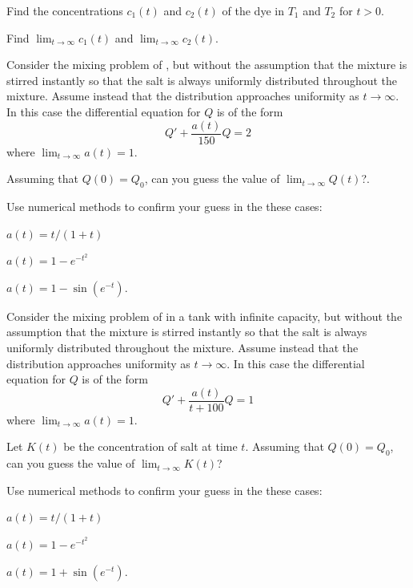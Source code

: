 \begin{exerciselist}
\begin{alist}
\item %
Find the concentrations $c_1(t)$ and $c_2(t)$ of the dye in $T_1$
and $T_2$ for $t>0$.
\item %
Find $\lim_{t\to\infty}c_1(t)$  and $\lim_{t\to\infty}c_2(t)$.
\end{alist}

\item\label{exer:4.2.22}\Lex
Consider the mixing problem of , but without
the assumption that the mixture is stirred instantly so that the salt
is always uniformly distributed throughout the mixture. Assume instead
that the distribution approaches uniformity as $t\to\infty$.
In this case the differential equation for $Q$ is  of the form
\[
Q'+\frac{a(t)}{150}Q=2
\]
where  $\lim_{t\to\infty}a(t)=1$.
\begin{alist}
\item %
Assuming that
$Q(0)=Q_0$, can you guess the value of
$\lim_{t\to\infty}Q(t)$?.
\item %
Use numerical methods to  confirm  your guess in the these cases:
\begin{rmlist}[columns=3]
\item $a(t)=t/(1+t)$
\item $a(t)=1-e^{-t^2}$
\item $a(t)=1-\sin(e^{-t})$.
\end{rmlist}
\end{alist}

\item\label{exer:4.2.23}\Lex
Consider the mixing problem of  in a tank with
infinite capacity, but without the assumption that the mixture is
stirred instantly so that the salt is always uniformly distributed
throughout the mixture. Assume instead that the distribution
approaches uniformity as $t\to\infty$. In this case the differential
equation for $Q$ is of the form
\[
Q'+\frac{a(t)}{t+100}Q=1
\]
where  $\lim_{t\to\infty}a(t)=1$.
\begin{alist}
\item %
Let $K(t)$ be the concentration of salt at time $t$. Assuming that
$Q(0)=Q_0$, can you guess the value of $\lim_{t\to\infty}K(t)$?
\item %
Use numerical methods to  confirm  your guess in the these cases:
\begin{rmlist}[columns=3]
\item $a(t)=t/(1+t)$
\item $a(t)=1-e^{-t^2}$
\item $a(t)=1+\sin(e^{-t})$.
\end{rmlist}
\end{alist}

\end{exerciselist}


